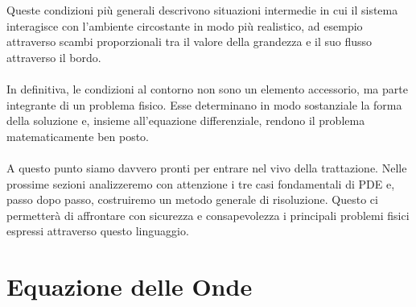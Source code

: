 \documentclass[a4paper,12pt]{report}
\begin{document}
\vspace{0.5cm}
Queste condizioni più generali descrivono situazioni intermedie in cui il sistema interagisce con l’ambiente circostante in modo più realistico, ad esempio attraverso scambi proporzionali tra il valore della grandezza e il suo flusso attraverso il bordo.
\\
\\In definitiva, le condizioni al contorno non sono un elemento accessorio, ma parte integrante di un problema fisico. Esse determinano in modo sostanziale la forma della soluzione e, insieme all’equazione differenziale, rendono il problema matematicamente ben posto.
\\
\\A questo punto siamo davvero pronti per entrare nel vivo della trattazione. Nelle prossime sezioni analizzeremo con attenzione i tre casi fondamentali di PDE e, passo dopo passo, costruiremo un metodo generale di risoluzione. Questo ci permetterà di affrontare con sicurezza e consapevolezza i principali problemi fisici espressi attraverso questo linguaggio.

\newpage

\section{Equazione delle Onde}
\end{document}
